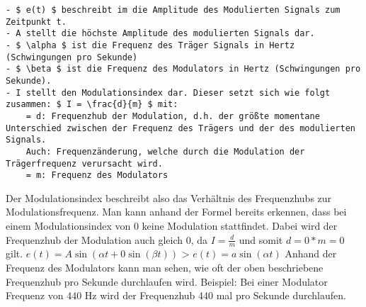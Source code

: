 \begin{lstlisting}[mathescape]
- $ e(t) $ beschreibt im die Amplitude des Modulierten Signals zum Zeitpunkt t.
- A stellt die höchste Amplitude des modulierten Signals dar. 
- $ \alpha $ ist die Frequenz des Träger Signals in Hertz (Schwingungen pro Sekunde)
- $ \beta $ ist die Frequenz des Modulators in Hertz (Schwingungen pro Sekunde). 
- I stellt den Modulationsindex dar. Dieser setzt sich wie folgt zusammen: $ I = \frac{d}{m} $ mit:
	= d: Frequenzhub der Modulation, d.h. der größte momentane Unterschied zwischen der Frequenz des Trägers und der des modulierten Signals.
	Auch: Frequenzänderung, welche durch die Modulation der Trägerfrequenz verursacht wird.
	= m: Frequenz des Modulators
\end{lstlisting}

Der Modulationsindex beschreibt also das Verhältnis des Frequenzhubs zur Modulationsfrequenz.
Man kann anhand der Formel bereits erkennen, dass bei einem Modulationsindex von 0 keine Modulation stattfindet. Dabei wird der Frequenzhub der Modulation auch gleich 0, da $ I=\frac{d}{m} $ und somit $ d = 0*m = 0 $ gilt. 
$ e(t) = A \sin(\alpha t + 0 \sin(\beta t)) $ > $ e(t) = a \sin(\alpha t) $
Anhand der Frequenz des Modulators kann man sehen, wie oft der oben beschriebene Frequenzhub pro Sekunde durchlaufen wird. Beispiel: Bei einer Modulator Frequenz von 440 Hz wird der Frequenzhub 440 mal pro Sekunde durchlaufen.
